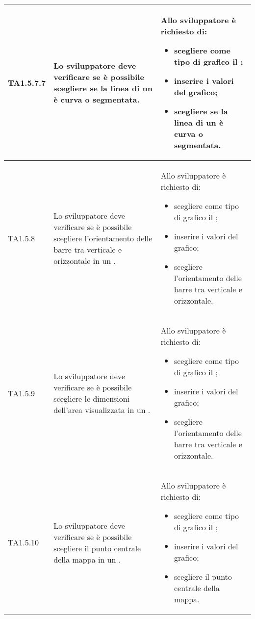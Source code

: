 \begin{longtabu}{| X[0.5] | X | X |}
	TA1.5.7.7 & Lo sviluppatore deve verificare se è possibile scegliere se la linea di un  è curva o segmentata.

		& Allo sviluppatore è richiesto di:
		\begin{itemize}
			\item scegliere come tipo di grafico il ;
			\item inserire i valori del grafico;
			\item scegliere se la linea di un  è curva o segmentata.
		\end{itemize}
\\ \hline

	TA1.5.8 & Lo sviluppatore deve verificare se è possibile scegliere l'orientamento delle barre tra verticale e orizzontale in un .

		& Allo sviluppatore è richiesto di:
		\begin{itemize}
			\item scegliere come tipo di grafico il ;
			\item inserire i valori del grafico;
			\item scegliere l'orientamento delle barre tra verticale e orizzontale.
		\end{itemize}
\\ \hline

	TA1.5.9 & Lo sviluppatore deve verificare se è possibile scegliere le dimensioni dell'area visualizzata in un .

		& Allo sviluppatore è richiesto di:
		\begin{itemize}
			\item scegliere come tipo di grafico il ;
			\item inserire i valori del grafico;
			\item scegliere l'orientamento delle barre tra verticale e orizzontale.
		\end{itemize}
\\ \hline

	TA1.5.10 & Lo sviluppatore deve verificare se è possibile scegliere il punto centrale della mappa in un .

		& Allo sviluppatore è richiesto di:
		\begin{itemize}
			\item scegliere come tipo di grafico il ;
			\item inserire i valori del grafico;
			\item scegliere il punto centrale della mappa.
		\end{itemize}
\\ \hline


\end{longtabu}
